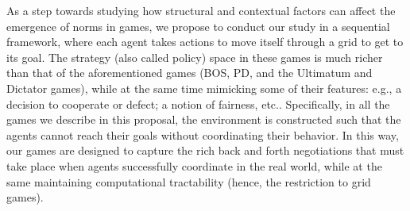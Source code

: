 As a step towards studying how structural and contextual factors can
affect the emergence of norms in games, we propose to conduct our
study in a sequential  framework, where each agent
takes actions to move itself through a grid to get to its goal.  The
strategy (also called policy) space in these games is much richer than
that of the aforementioned games (BOS, PD, and the Ultimatum and
Dictator games), while at the same time mimicking some of their
features: e.g., a decision to cooperate or defect; a notion of
fairness, etc..  Specifically, in all the games we describe in this
proposal, the environment is constructed such that the agents cannot
reach their goals without coordinating their behavior.  In this way,
our games are designed to capture the rich back and forth negotiations
that must take place when agents successfully coordinate in the real
world, while at the same maintaining computational tractability
(hence, the restriction to grid games).

